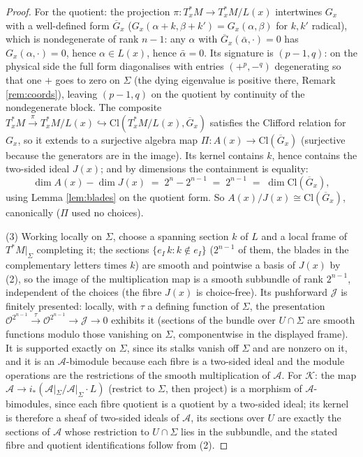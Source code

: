 \documentclass[11pt]{article}
\theoremstyle{definition}
\newcommand{\Cl}{\mathrm{Cl}}
\newcommand{\shA}{\mathcal{A}}
\newcommand{\shJ}{\mathcal{J}}
\newcommand{\shK}{\mathcal{K}}
\newcommand{\shL}{L}
\newcommand{\Sig}{\Sigma}
\begin{document}
\begin{proof}
For the quotient: the projection $\pi : T^*_xM \to T^*_xM/\shL(x)$ intertwines $G_x$ with a well-defined form $\overline{G}_x$ ($G_x(\alpha + k, \beta + k') = G_x(\alpha, \beta)$ for $k, k'$ radical), which is nondegenerate of rank $n - 1$: any $\alpha$ with $\overline{G}_x(\bar\alpha, \cdot) = 0$ has $G_x(\alpha, \cdot) = 0$, hence $\alpha \in \shL(x)$, hence $\bar\alpha = 0$. Its signature is $(p{-}1, q)$: on the physical side the full form diagonalises with entries $(+^{p}, -^{q})$ degenerating so that one $+$ goes to zero on $\Sig$ (the dying eigenvalue is positive there, Remark \ref{rem:coords}), leaving $(p{-}1, q)$ on the quotient by continuity of the nondegenerate block. The composite $T^*_xM \xrightarrow{\pi} T^*_xM/\shL(x) \hookrightarrow \Cl(T^*_xM/\shL(x), \overline{G}_x)$ satisfies the Clifford relation for $G_x$, so it extends to a surjective algebra map $\Pi : A(x) \to \Cl(\overline{G}_x)$ (surjective because the generators are in the image). Its kernel contains $k$, hence contains the two-sided ideal $J(x)$; and by dimensions the containment is equality:
\[
\dim A(x) - \dim J(x) \;=\; 2^n - 2^{n-1} \;=\; 2^{n-1} \;=\; \dim \Cl(\overline{G}_x),
\]
using Lemma \ref{lem:blades} on the quotient form. So $A(x)/J(x) \cong \Cl(\overline{G}_x)$, canonically ($\Pi$ used no choices).

(3) Working locally on $\Sig$, choose a spanning section $k$ of $\shL$ and a local frame of $T^*M|_\Sig$ completing it; the sections $\{e_I\, k : k \notin e_I\}$ ($2^{n-1}$ of them, the blades in the complementary letters times $k$) are smooth and pointwise a basis of $J(x)$ by (2), so the image of the multiplication map is a smooth subbundle of rank $2^{n-1}$, independent of the choices (the fibre $J(x)$ is choice-free). Its pushforward $\shJ$ is finitely presented: locally, with $\tau$ a defining function of $\Sig$, the presentation $\mathcal{O}^{2^{n-1}} \xrightarrow{\ \tau\ } \mathcal{O}^{2^{n-1}} \to \shJ \to 0$ exhibits it (sections of the bundle over $U \cap \Sig$ are smooth functions modulo those vanishing on $\Sig$, componentwise in the displayed frame). It is supported exactly on $\Sig$, since its stalks vanish off $\Sig$ and are nonzero on it, and it is an $\shA$-bimodule because each fibre is a two-sided ideal and the module operations are the restrictions of the smooth multiplication of $\shA$. For $\shK$: the map $\shA \to i_*(\shA|_\Sig / \shA|_\Sig \cdot \shL)$ (restrict to $\Sig$, then project) is a morphism of $\shA$-bimodules, since each fibre quotient is a quotient by a two-sided ideal; its kernel is therefore a sheaf of two-sided ideals of $\shA$, its sections over $U$ are exactly the sections of $\shA$ whose restriction to $U \cap \Sig$ lies in the subbundle, and the stated fibre and quotient identifications follow from (2).
\end{proof}
\end{document}
